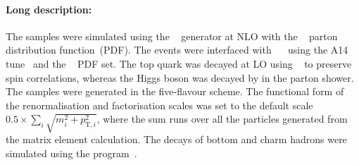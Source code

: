 \paragraph{Long description:}

The \tHW{} samples were simulated using the \MGNLO[2.6.2]~\cite{Alwall:2014hca}
generator at NLO with the \NNPDF[3.0nlo]~\cite{Ball:2014uwa} parton distribution function~(PDF). The events were interfaced with
\PYTHIA[8.235]~\cite{Sjostrand:2014zea}~ using the A14 tune~\cite{ATL-PHYS-PUB-2014-021} and the \NNPDF[2.3lo]~\cite{Ball:2014uwa} PDF set. 
The top quark was decayed at LO using \MADSPIN~\cite{Frixione:2007zp,Artoisenet:2012st} to preserve spin correlations,
whereas the Higgs boson was decayed by \PYTHIA in the parton shower. The samples
were generated in the five-flavour scheme.
The functional form of the renormalisation and factorisation scales was set to the 
default scale $0.5\times \sum_i \sqrt{m^2_i+p^2_{\text{T},i}}$, where the sum runs over 
all the particles generated from the matrix element calculation.
The decays of bottom and charm hadrons were simulated using the \EVTGEN[1.6.0] program~\cite{Lange:2001uf}.
